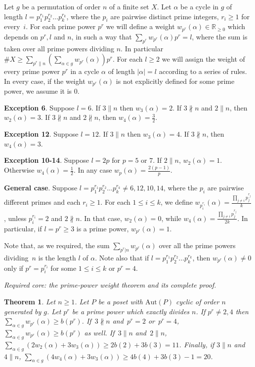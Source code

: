 \documentclass[10pt,a4paper]{amsart}
\renewcommand{\sigma}{g}
\newcommand{\R}{\mathbb{R}}
\newcommand{\aut}{\textrm{Aut}}
\theoremstyle{plain}
\newtheorem{teo}[cdrthm]{Theorem}
\theoremstyle{definition}
\theoremstyle{remark}
\begin{document}
Let $\sigma$ be a permutation of order $n$ of a finite set $X$. Let $\alpha$ be a cycle in $\sigma$ of length $l=p_1^{r_1}p_2^{r_2}\ldots p_k^{r_k}$, where the $p_i$ are pairwise distinct prime integers, $r_i\ge 1$ for every~$i$. For each prime power $p^r$ we will define a weight $w_{p^r}(\alpha)\in \R_{\ge 0}$ which depends on $p^r,l$ and $n$, in such a way that $\sum\limits_{p^r} w_{p^r}(\alpha)p^r= l$, where the sum is taken over all prime powers dividing $n$. In particular $\# X\ge \sum\limits_{p^r\parallel n} (\sum\limits_{\alpha \in \sigma} w_{p^r}(\alpha))p^r$. For each $l\ge 2$ we will assign the weight of every prime power $p^r$ in a cycle $\alpha$ of length $|\alpha|=l$ according to a series of rules. In every case, if the weight $w_{p^r}(\alpha)$ is not explicitly defined for some prime power, we assume it is $0$.  

\noindent \textbf{Exception 6}. Suppose $l=6$. If $3\parallel n$ then $w_3(\alpha)=2$. If $3\nparallel n$ and $2\parallel n$, then $w_{2}(\alpha)=3$. If $3\nparallel n$ and $2\nparallel n$, then $w_4(\alpha)=\frac{3}{2}$.

\noindent \textbf{Exception 12}. Suppose $l=12$. If $3\parallel n$ then $w_3(\alpha)=4$. If $3\nparallel n$, then $w_{4}(\alpha)=3$.

\noindent \textbf{Exception 10-14}. Suppose $l=2p$ for $p=5$ or $7$. If $2\parallel n$, $w_2(\alpha)=1$. Otherwise $w_4(\alpha)=\frac{1}{2}$. In any case $w_p(\alpha)=\frac{2(p-1)}{p}$.

\noindent \textbf{General case}. Suppose  $l=p_1^{r_1}p_2^{r_2}\ldots p_k^{r_k}\neq 6,12,10,14$, where the $p_i$ are pairwise different primes and each $r_i\ge 1$. For each $1\le i\le k$, we define $w_{p_i^{r_i}}(\alpha)=\frac{\prod\limits_{j\neq i} p_j^{r_j}}{k}$, unless $p_i^{r_i}=2$ and $2\nparallel n$. In that case, $w_2(\alpha)=0$, while $w_4(\alpha)=\frac{\prod\limits_{j\neq i} p_j^{r_j}}{2k}$. In particular, if $l=p^r\ge 3$ is a prime power, $w_{p^r}(\alpha)=1$.

Note that, as we required, the sum $\sum\limits_{p^r|n} w_{p^r}(\alpha)$ over all the prime powers dividing~$n$ is the length $l$ of $\alpha$. Note also that if $l=p_1^{r_1}p_2^{r_2}\ldots p_k^{r_k}$, then $w_{p^r}(\alpha)\neq 0$ only if $p^r=p_i^{r_i}$ for some $1\le i\le k$ or $p^r=4$. 

\noindent\textit{Required core: the prime-power weight theorem and its complete proof.}
\begin{teo} \label{main}
Let $n\ge 1$. Let $P$ be a poset with $\aut (P)$ cyclic of order $n$ generated by $g$. Let $p^r$ be a prime power which exactly divides $n$. If $p^r\neq 2,4$ then \mbox{$\sum\limits_{\alpha \in \sigma} w_{p^r}(\alpha)\ge b(p^r)$}. 
If~$3\nparallel n$ and~$p^r=2$ or~$p^r=4$, $\sum\limits_{\alpha \in \sigma} w_{p^r}(\alpha)\ge b(p^r)$ as well.
If~$3\parallel n$ and~$2\parallel n$, $\sum\limits_{\alpha \in \sigma} (2w_{2}(\alpha)+3w_{3}(\alpha))\ge 2b(2)+3b(3)=11$. Finally, if $3\parallel n$ and~$4\parallel n$, $\sum\limits_{\alpha \in \sigma} (4w_{4}(\alpha)+3w_{3}(\alpha))\ge 4b(4)+3b(3)-1=20$.
\end{teo}
\end{document}
